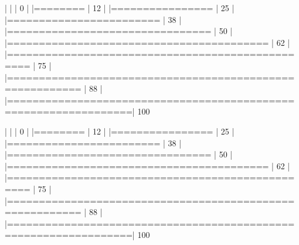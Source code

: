 \documentclass[10pt]{article}
\newenvironment{CodeChunk}{}{}
\begin{document}
\begin{CodeChunk}
\begin{CodeChunk}
\begin{CodeOutput}
  |                                                                       
  |                                                                 |   0%
  |                                                                       
  |========                                                         |  12%
  |                                                                       
  |================                                                 |  25%
  |                                                                       
  |========================                                         |  38%
  |                                                                       
  |================================                                 |  50%
  |                                                                       
  |=========================================                        |  62%
  |                                                                       
  |=================================================                |  75%
  |                                                                       
  |=========================================================        |  88%
  |                                                                       
  |=================================================================| 100%

  |                                                                       
  |                                                                 |   0%
  |                                                                       
  |========                                                         |  12%
  |                                                                       
  |================                                                 |  25%
  |                                                                       
  |========================                                         |  38%
  |                                                                       
  |================================                                 |  50%
  |                                                                       
  |=========================================                        |  62%
  |                                                                       
  |=================================================                |  75%
  |                                                                       
  |=========================================================        |  88%
  |                                                                       
  |=================================================================| 100%


\end{CodeOutput}
\end{CodeChunk}
\end{CodeChunk}
\end{document}
